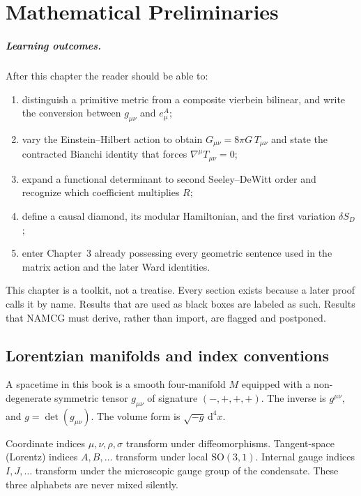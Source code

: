 \chapter[Preliminaries]{Mathematical Preliminaries}
\label{ch:preliminaries}

\paragraph{Learning outcomes.}
After this chapter the reader should be able to:
\begin{enumerate}
  \item distinguish a primitive metric from a composite vierbein
        bilinear, and write the conversion between \(g_{\mu\nu}\) and
        \(e^A_\mu\);
  \item vary the Einstein--Hilbert action to obtain
        \(G_{\mu\nu}=8\pi G\,T_{\mu\nu}\) and state the contracted
        Bianchi identity that forces
        \(\nabla^\mu T_{\mu\nu}=0\);
  \item expand a functional determinant to second Seeley--DeWitt order
        and recognize which coefficient multiplies \(R\);
  \item define a causal diamond, its modular Hamiltonian, and the
        first variation \(\delta S_D\);
  \item enter Chapter~3 already possessing every geometric sentence
        used in the matrix action and the later Ward identities.
\end{enumerate}

This chapter is a toolkit, not a treatise. Every section exists because
a later proof calls it by name. Results that are used as black boxes
are labeled as such. Results that NAMCG must derive, rather than
import, are flagged and postponed.

\section{Lorentzian manifolds and index conventions}
\label{sec:ch2-manifolds}

A spacetime in this book is a smooth four-manifold \(M\) equipped with
a non-degenerate symmetric tensor \(g_{\mu\nu}\) of signature
\((-,+,+,+)\). The inverse is \(g^{\mu\nu}\), and
\(g=\det(g_{\mu\nu})\). The volume form is
\(\sqrt{-g}\,\mathrm{d}^4x\).

Coordinate indices \(\mu,\nu,\rho,\sigma\) transform under
diffeomorphisms. Tangent-space (Lorentz) indices \(A,B,\ldots\)
transform under local \(\mathrm{SO}(3,1)\). Internal gauge indices
\(I,J,\ldots\) transform under the microscopic gauge group of the
condensate. These three alphabets are never mixed silently.

